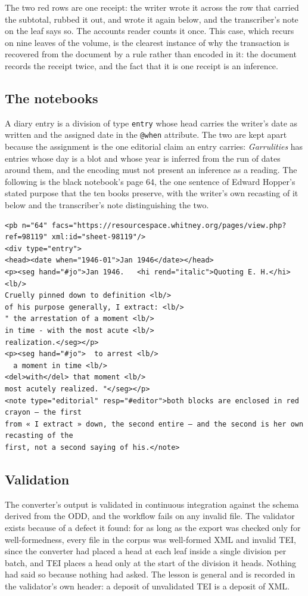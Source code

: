 \documentclass[11pt]{article}
\begin{document}
The two red rows are one receipt: the writer wrote it across the row that carried the subtotal, rubbed it out, and wrote it again below, and the transcriber's note on the leaf says so. The accounts reader counts it once. This case, which recurs on nine leaves of the volume, is the clearest instance of why the transaction is recovered from the document by a rule rather than encoded in it: the document records the receipt twice, and the fact that it is one receipt is an inference.

\subsection{The notebooks}

A diary entry is a division of type \texttt{entry} whose head carries the writer's date as written and the assigned date in the \texttt{@when} attribute. The two are kept apart because the assignment is the one editorial claim an entry carries: \emph{Garrulities} has entries whose day is a blot and whose year is inferred from the run of dates around them, and the encoding must not present an inference as a reading. The following is the black notebook's page 64, the one sentence of Edward Hopper's stated purpose that the ten books preserve, with the writer's own recasting of it below and the transcriber's note distinguishing the two.

\begin{lstlisting}
<pb n="64" facs="https://resourcespace.whitney.org/pages/view.php?ref=98119" xml:id="sheet-98119"/>
<div type="entry">
<head><date when="1946-01">Jan 1946</date></head>
<p><seg hand="#jo">Jan 1946.   <hi rend="italic">Quoting E. H.</hi> <lb/>
Cruelly pinned down to definition <lb/>
of his purpose generally, I extract: <lb/>
" the arrestation of a moment <lb/>
in time - with the most acute <lb/>
realization.</seg></p>
<p><seg hand="#jo">  to arrest <lb/>
  a moment in time <lb/>
<del>with</del> that moment <lb/>
most acutely realized. "</seg></p>
<note type="editorial" resp="#editor">both blocks are enclosed in red crayon — the first
from « I extract » down, the second entire — and the second is her own recasting of the
first, not a second saying of his.</note>
\end{lstlisting}

\subsection{Validation}

The converter's output is validated in continuous integration against the schema derived from the ODD, and the workflow fails on any invalid file. The validator exists because of a defect it found: for as long as the export was checked only for well-formedness, every file in the corpus was well-formed XML and invalid TEI, since the converter had placed a head at each leaf inside a single division per batch, and TEI places a head only at the start of the division it heads. Nothing had said so because nothing had asked. The lesson is general and is recorded in the validator's own header: a deposit of unvalidated TEI is a deposit of XML.
\end{document}
